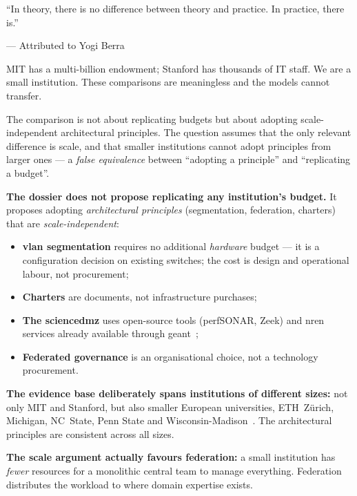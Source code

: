 \epigraph{``In theory, there is no difference between theory and practice. In practice, there is.''}{--- Attributed to Yogi Berra}

\begin{clarificationbox}
MIT has a multi-billion endowment; Stanford has thousands of IT staff. We are a small institution. These comparisons are meaningless and the models cannot transfer.
\end{clarificationbox}

\begin{answerbox}[Answer to Q5.1]
The comparison is not about replicating budgets but about adopting scale-independent architectural principles. The question assumes that the only relevant difference is scale, and that smaller institutions cannot adopt principles from larger ones --- a \emph{false equivalence} between ``adopting a principle'' and ``replicating a budget''.

\medskip\noindent\textbf{The dossier does not propose replicating any institution's budget.} It proposes adopting \emph{architectural principles} (segmentation, federation, charters) that are \emph{scale-independent}:
\begin{itemize}[nosep]
    \item \textbf{\gls{vlan} segmentation} requires no additional \emph{hardware} budget --- it is a configuration decision on existing switches; the cost is design and operational labour, not procurement;
    \item \textbf{Charters} are documents, not infrastructure purchases;
    \item \textbf{The \gls{sciencedmz}} uses open-source tools (perfSONAR, Zeek) and \gls{nren} services already available through \gls{geant}~\cite{geant, perfsonar};
    \item \textbf{Federated governance} is an organisational choice, not a technology procurement.
\end{itemize}

\noindent\textbf{The evidence base deliberately spans institutions of different sizes:} not only MIT and Stanford, but also smaller European universities, ETH~Z\"urich, Michigan, NC~State, Penn State and Wisconsin-Madison~\cite{ncsu-governance, pennstate-it, uw-madison, umich-it-council}. The architectural principles are consistent across all sizes.

\medskip\noindent\textbf{The scale argument actually favours federation:} a small institution has \emph{fewer} resources for a monolithic central team to manage everything. Federation distributes the workload to where domain expertise exists.


\end{answerbox}
